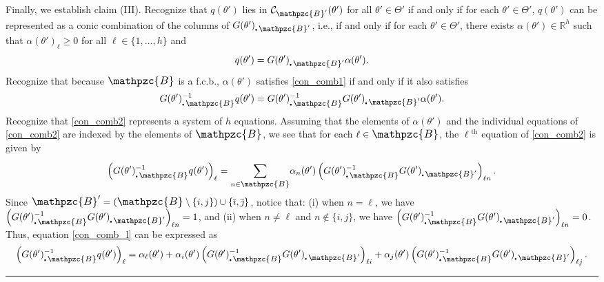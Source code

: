 \documentclass[11pt]{article}
\newenvironment{proof}{{\bf Proof:}}{\hfill\rule{2mm}{2mm}}
\newcommand{\su}[2][1]{\ensuremath{\displaystyle{\sum_{#1}^{#2}}}}
\newcommand{\R}{\mathbb{R}}
\newcommand{\h}{{}^{\text{th}}}
\newcommand{\bul}{\scalebox{.45}{\ensuremath{\bullet}}}
\newcommand{\B}{\mathbin{\ThisStyle{\scalebox{1.15}{$\SavedStyle\ensuremath{\mathpzc{B}}$}}}}
\newcommand{\IR}{\mathcal{IR}}
\newcommand{\compcone}[2]{\mathcal{C}_{#1}(#2)}
\newcommand{\invRgn}[1]{\IR_{#1}}
\renewcommand{\complement}[1]{\overline{#1}}
\begin{document}
\begin{enumerate}
\begin{proof}
Finally, we establish claim (III). Recognize that $q(\theta')$ lies in $\compcone{\B'}{\theta'}$ for all $\theta' \in \Theta'$ if and only if for each $\theta' \in \Theta'$, $q(\theta')$ can be represented as a conic combination of the columns of $G(\theta')_{\bul\, \B'}$, i.e., if and only if for each $\theta' \in \Theta'$, there exists $\alpha(\theta') \in \R^h$ such that $\alpha(\theta')_\ell \geq 0$ for all $\ell \in \{1,\dots,h\}$ and 
\begin{equation}\label{con_comb1}
q(\theta') = G(\theta')_{\bul\, \B'}\alpha(\theta').
\end{equation}
Recognize that because $\B$ is a f.c.b., $\alpha(\theta')$ satisfies \eqref{con_comb1} if and only if it also satisfies
\begin{equation}\label{con_comb2}
G(\theta')_{\bul\, \B}^{-1}q(\theta') = G(\theta')_{\bul\, \B}^{-1}G(\theta')_{\bul\, \B'}\alpha(\theta').
\end{equation}
Recognize that \eqref{con_comb2} represents a system of $h$ equations. Assuming that the elements of $\alpha(\theta')$ and the individual equations of \eqref{con_comb2} are indexed by the elements of $\B$, we see that for each $\ell \in \B$, the $\ell\h$ equation of \eqref{con_comb2} is given by
\begin{equation}\label{con_comb_l}
\left(G(\theta')_{\bul\, \B}^{-1}q(\theta')\right)_\ell = \su[n \in \B]{}\alpha_n(\theta')\left( G(\theta')_{\bul\, \B}^{-1}G(\theta')_{\bul\, \B'}\right)_{\ell n}.
\end{equation}
Since $\B' = (\B \setminus \{i,j\}) \cup \{\complement{\imath},\complement{\jmath}\}$, notice that: (i) when $n = \ell$, we have $\left( G(\theta')_{\bul\, \B}^{-1}G(\theta')_{\bul\, \B'}\right)_{\ell n} = 1$, and (ii) when $n \neq \ell$ and $n \not\in \{i,j\}$, we have $\left( G(\theta')_{\bul\, \B}^{-1}G(\theta')_{\bul\, \B'}\right)_{\ell n} = 0$. Thus, equation \eqref{con_comb_l} can be expressed as
\begin{equation}\label{con_comb_l2}
\left(G(\theta')_{\bul\, \B}^{-1}q(\theta')\right)_\ell = \alpha_\ell(\theta') + \alpha_i(\theta')\left( G(\theta')_{\bul\, \B}^{-1}G(\theta')_{\bul\, \B'}\right)_{\ell i} + \alpha_j(\theta')\left( G(\theta')_{\bul\, \B}^{-1}G(\theta')_{\bul\, \B'}\right)_{\ell j}.

\end{equation}
\end{proof}
\end{enumerate}
\end{document}
